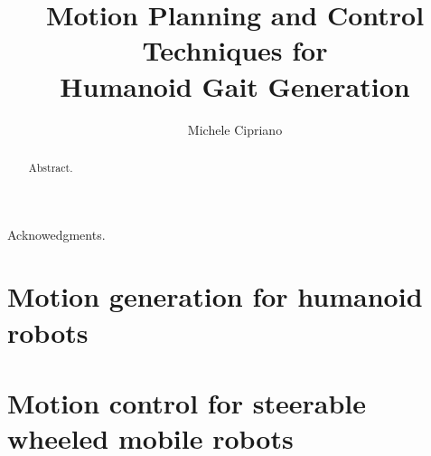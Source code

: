 \documentclass[oneside]{sapthesis}
\title{Motion Planning and Control Techniques for \\Humanoid Gait Generation}
\author{Michele Cipriano}
\begin{document}
\frontmatter

\maketitle

\begin{acknowledgments}
Acknowedgments.
\end{acknowledgments}

\begin{abstract}
Abstract.
\end{abstract}

\tableofcontents

\mainmatter



\part{Motion generation for humanoid robots}




\part{Motion control for steerable wheeled mobile robots}





\backmatter
\cleardoublepage
{}

\end{document}
